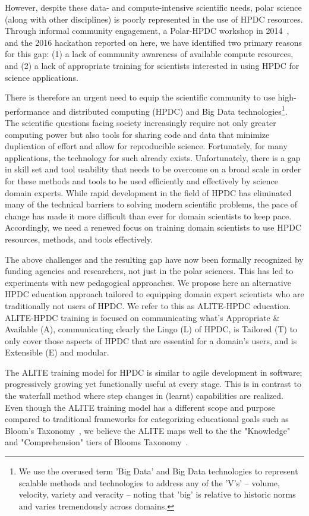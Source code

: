 \documentclass[conference]{IEEEtran}
\begin{document}
However, despite these data- and compute-intensive scientific needs, polar science (along with other disciplines) is poorly represented in the use of HPDC resources. Through informal community engagement, a Polar-HPDC workshop in 2014~\cite{Workshop2014}, and the 2016 hackathon reported on here, we have identified two primary reasons for this gap: (1) a lack of community awareness of available compute resources, and (2) a lack of appropriate training for scientists interested in using HPDC for science applications. 

There is therefore an urgent need to equip the scientific community to use high-performance and distributed computing (HPDC) and Big Data technologies\footnote{ We use the overused term 'Big Data' and Big Data technologies to represent scalable methods and technologies to address any of the 'V's'  -- volume, velocity, variety and veracity -- noting that 'big' is relative to historic norms and varies tremendously across domains.}. The scientific questions facing society increasingly require not only greater computing power but also tools for sharing code and data that minimize duplication of effort and allow for reproducible science. Fortunately, for many applications, the technology for such already exists. Unfortunately, there is a gap in skill set and tool usability that needs to be overcome on a broad scale in order for these methods and tools to be used efficiently and effectively by science domain experts. While rapid development in the field of HPDC has eliminated many of the technical barriers to solving modern scientific problems, the pace of change has made it more difficult than ever for domain scientists to keep pace. Accordingly, we need a renewed focus on training domain scientists to use HPDC resources, methods, and tools effectively. 

The above challenges and the resulting gap have now been formally recognized
by funding agencies and researchers, not just in the polar sciences. This has
led to experiments with new pedagogical approaches. We propose here an
alternative HPDC education approach tailored to equipping domain expert
scientists who are traditionally not users of HPDC.  We refer to this as
ALITE-HPDC education. ALITE-HPDC training is focused on communicating what's
Appropriate \& Available (A), communicating clearly the Lingo (L) of HPDC, is
Tailored (T) to only cover those aspects of HPDC that are essential for a
domain's users, and is Extensible (E) and modular.  

The ALITE training model for HPDC is similar to agile development in software;
progressively growing yet functionally useful at every stage. This is in
contrast to the waterfall method where step changes in (learnt) capabilities
are realized. Even though the ALITE training model has a different scope and
purpose  compared to traditional frameworks for categorizing educational goals
such as Bloom's Taxonomy~\cite{bloom}, we believe the ALITE maps well to the
the "Knowledge" and "Comprehension" tiers of 
Blooms Taxonomy~\cite{bloom-vanderbilt}.
\end{document}
